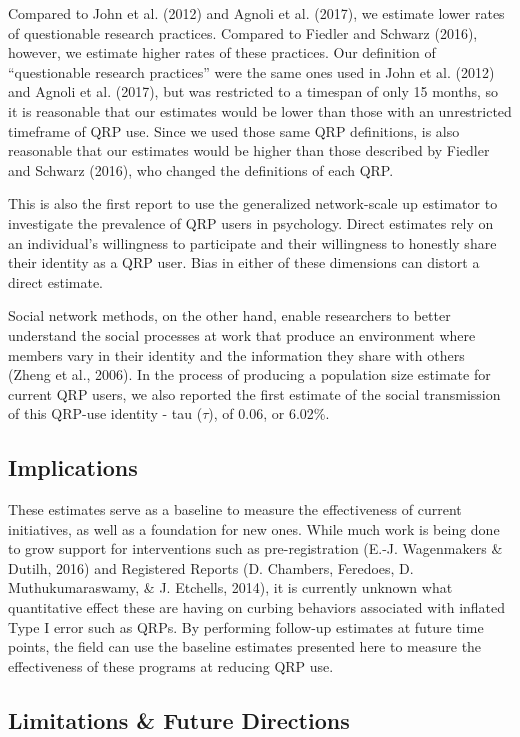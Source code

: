 \documentclass[jou]{apa6}
\theoremstyle{definition}
\theoremstyle{definition}
\theoremstyle{definition}
\theoremstyle{remark}
\begin{document}
Compared to John et al. (2012) and Agnoli et al. (2017), we estimate
lower rates of questionable research practices. Compared to Fiedler and
Schwarz (2016), however, we estimate higher rates of these practices.
Our definition of \enquote{questionable research practices} were the
same ones used in John et al. (2012) and Agnoli et al. (2017), but was
restricted to a timespan of only 15 months, so it is reasonable that our
estimates would be lower than those with an unrestricted timeframe of
QRP use. Since we used those same QRP definitions, is also reasonable
that our estimates would be higher than those described by Fiedler and
Schwarz (2016), who changed the definitions of each QRP.

This is also the first report to use the generalized network-scale up
estimator to investigate the prevalence of QRP users in psychology.
Direct estimates rely on an individual's willingness to participate and
their willingness to honestly share their identity as a QRP user. Bias
in either of these dimensions can distort a direct estimate.

Social network methods, on the other hand, enable researchers to better
understand the social processes at work that produce an environment
where members vary in their identity and the information they share with
others (Zheng et al., 2006). In the process of producing a population
size estimate for current QRP users, we also reported the first estimate
of the social transmission of this QRP-use identity - tau (\(\tau\)), of
0.06, or 6.02\%.

\subsection{Implications}\label{implications}

These estimates serve as a baseline to measure the effectiveness of
current initiatives, as well as a foundation for new ones. While much
work is being done to grow support for interventions such as
pre-registration (E.-J. Wagenmakers \& Dutilh, 2016) and Registered
Reports (D. Chambers, Feredoes, D. Muthukumaraswamy, \& J. Etchells,
2014), it is currently unknown what quantitative effect these are having
on curbing behaviors associated with inflated Type I error such as QRPs.
By performing follow-up estimates at future time points, the field can
use the baseline estimates presented here to measure the effectiveness
of these programs at reducing QRP use.

\subsection{Limitations \& Future
Directions}\label{limitations-future-directions}
\end{document}
